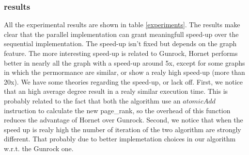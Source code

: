 \documentclass[journal]{IEEEtran}
\begin{document}
\subsubsection{results}
All the experimental results are shown in table \ref{experiments}.
The results make clear that the parallel implementation can grant meaningfull
speed-up over the sequential implementation. The speed-up isn't fixed but
depends on the graph feature.
The more interesting speed-up is related to Gunrock, Hornet performs better
in nearly all the graph with a speed-up around 5x, except for some graphs in
which the permormance are similar, or show a realy high speed-up (more than
20x).
We have some theories regarding the speed-up, or lack off. First, we notice
that an high average degree result in a realy similar execution time.
This is probably related to the fact that both the algorithm use an ${atomicAdd}$
instruction to calculate the new page\_rank, so the overhead of this function
reduces the advantage of Hornet over Gunrock.
Second, we notice that when the speed up is realy high the number of iteration
of the two algorithm are strongly different. That probably due to better 
implemetation choices in our algorithm w.r.t. the Gunrock one.
\end{document}
